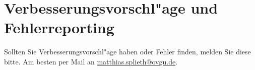 \chapter{Verbesserungsvorschl"age und Fehlerreporting}
Sollten Sie Verbesserungsvorschl"age haben oder Fehler finden, melden Sie diese bitte. Am besten per Mail an \url{matthias.splieth@ovgu.de}.